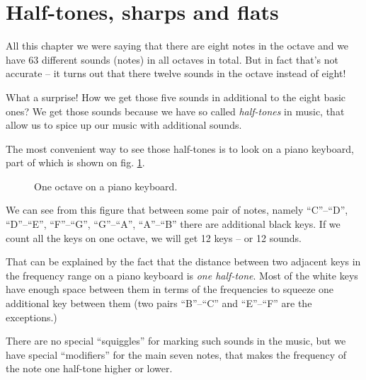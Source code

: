 \documentclass[../sparc.tex]{subfiles}
\begin{document}
\section{Half-tones, sharps and flats}

All this chapter we were saying that there are eight notes in the octave and we
have 63 different sounds (notes) in all octaves in total.  But in fact that's
not accurate -- it turns out that there twelve sounds in the octave instead of
eight!

What a surprise!  How we get those five sounds in additional to the eight basic
ones?  We get those sounds because we have so called \emph{half-tones} in music,
that allow us to spice up our music with additional sounds.

The most convenient way to see those half-tones is to look on a piano keyboard,
part of which is shown on fig. \ref{fig:piano-keyboard}.

\begin{figure}[ht]
  \centering
  \label{fig:piano-keyboard}
  \caption{One octave on a piano keyboard.}
\end{figure}

We can see from this figure that between some pair of notes, namely ``C''--``D'',
``D''--``E'', ``F''--``G'', ``G''--``A'', ``A''--``B'' there are additional black
keys.  If we count all the keys on one octave, we will get 12 keys -- or 12
sounds.

That can be explained by the fact that the distance between two adjacent keys in
the frequency range on a piano keyboard is \emph{one half-tone}.  Most of the
white keys have enough space between them in terms of the frequencies to squeeze
one additional key between them (two pairs ``B''--``C'' and ``E''--``F'' are the
exceptions.)

There are no special ``squiggles'' for marking such sounds in the music, but we
have special ``modifiers'' for the main seven notes, that makes the frequency of
the note one half-tone higher or lower.
\end{document}
